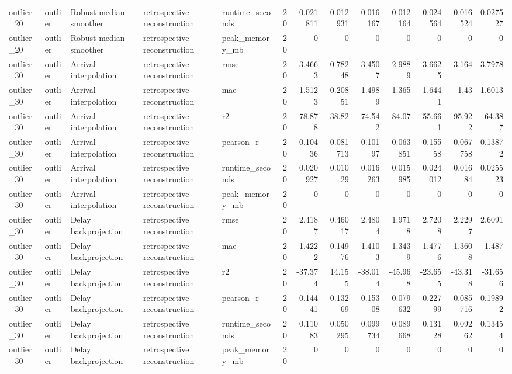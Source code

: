 \begin{table}[!htbp]
{{\begin{tabular}{lllllrrrrrrrr}
outlier_20 & outlier & Robust median smoother & retrospective reconstruction & runtime_seconds & 20 & 0.021811 & 0.012931 & 0.016167 & 0.012164 & 0.024564 & 0.016524 & 0.027527 \\
outlier_20 & outlier & Robust median smoother & retrospective reconstruction & peak_memory_mb & 20 & 0 & 0 & 0 & 0 & 0 & 0 & 0 \\
outlier_30 & outlier & Arrival interpolation & retrospective reconstruction & rmse & 20 & 3.4663 & 0.78248 & 3.4507 & 2.9889 & 3.6625 & 3.164 & 3.7978 \\
outlier_30 & outlier & Arrival interpolation & retrospective reconstruction & mae & 20 & 1.5123 & 0.20851 & 1.4989 & 1.365 & 1.6441 & 1.43 & 1.6013 \\
outlier_30 & outlier & Arrival interpolation & retrospective reconstruction & r2 & 20 & -78.878 & 38.82 & -74.542 & -84.07 & -55.661 & -95.922 & -64.387 \\
outlier_30 & outlier & Arrival interpolation & retrospective reconstruction & pearson_r & 20 & 0.10436 & 0.081713 & 0.10197 & 0.063851 & 0.15558 & 0.067758 & 0.13872 \\
outlier_30 & outlier & Arrival interpolation & retrospective reconstruction & runtime_seconds & 20 & 0.020927 & 0.01029 & 0.016263 & 0.015985 & 0.024012 & 0.01684 & 0.025523 \\
outlier_30 & outlier & Arrival interpolation & retrospective reconstruction & peak_memory_mb & 20 & 0 & 0 & 0 & 0 & 0 & 0 & 0 \\
outlier_30 & outlier & Delay backprojection & retrospective reconstruction & rmse & 20 & 2.4187 & 0.46017 & 2.4804 & 1.9718 & 2.7208 & 2.2297 & 2.6091 \\
outlier_30 & outlier & Delay backprojection & retrospective reconstruction & mae & 20 & 1.4222 & 0.14976 & 1.4103 & 1.3439 & 1.4776 & 1.3608 & 1.487 \\
outlier_30 & outlier & Delay backprojection & retrospective reconstruction & r2 & 20 & -37.374 & 14.155 & -38.014 & -45.968 & -23.655 & -43.318 & -31.656 \\
outlier_30 & outlier & Delay backprojection & retrospective reconstruction & pearson_r & 20 & 0.14441 & 0.13269 & 0.15308 & 0.079632 & 0.22799 & 0.085716 & 0.19892 \\
outlier_30 & outlier & Delay backprojection & retrospective reconstruction & runtime_seconds & 20 & 0.11083 & 0.050295 & 0.099734 & 0.089668 & 0.13128 & 0.09262 & 0.13454 \\
outlier_30 & outlier & Delay backprojection & retrospective reconstruction & peak_memory_mb & 20 & 0 & 0 & 0 & 0 & 0 & 0 & 0 \\

\end{tabular}}}
\end{table}
